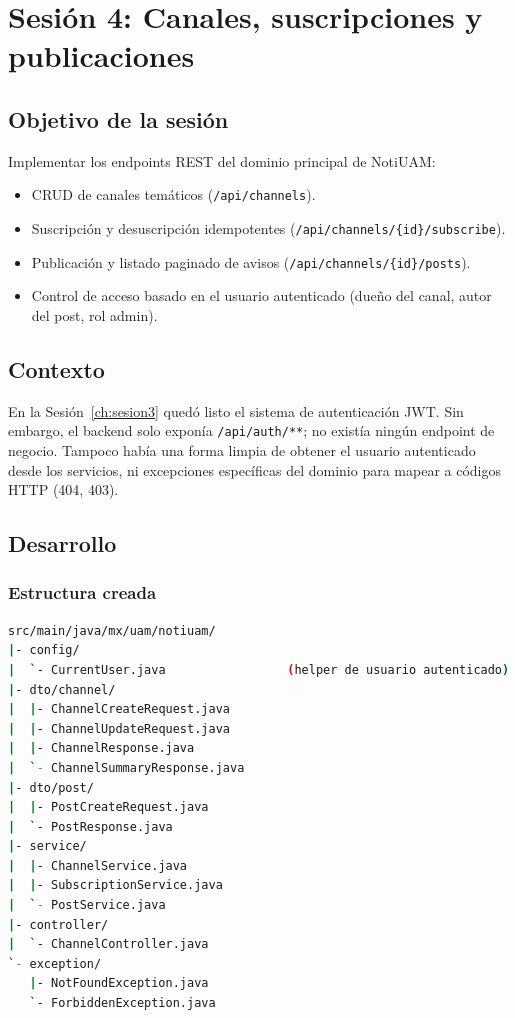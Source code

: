 \chapter{Sesión 4: Canales, suscripciones y publicaciones}
\label{ch:sesion4}

\section{Objetivo de la sesión}

Implementar los endpoints REST del dominio principal de NotiUAM:

\begin{itemize}[leftmargin=*]
  \item CRUD de canales temáticos (\texttt{/api/channels}).
  \item Suscripción y desuscripción idempotentes (\texttt{/api/channels/\{id\}/subscribe}).
  \item Publicación y listado paginado de avisos (\texttt{/api/channels/\{id\}/posts}).
  \item Control de acceso basado en el usuario autenticado (dueño del canal, autor del post, rol admin).
\end{itemize}

\section{Contexto}

En la Sesión~\ref{ch:sesion3} quedó listo el sistema de autenticación JWT. Sin embargo, el backend solo exponía \texttt{/api/auth/**}; no existía ningún endpoint de negocio. Tampoco había una forma limpia de obtener el usuario autenticado desde los servicios, ni excepciones específicas del dominio para mapear a códigos HTTP (404, 403).

\section{Desarrollo}

\subsection{Estructura creada}

\begin{lstlisting}[language=bash]
src/main/java/mx/uam/notiuam/
|- config/
|  `- CurrentUser.java                 (helper de usuario autenticado)
|- dto/channel/
|  |- ChannelCreateRequest.java
|  |- ChannelUpdateRequest.java
|  |- ChannelResponse.java
|  `- ChannelSummaryResponse.java
|- dto/post/
|  |- PostCreateRequest.java
|  `- PostResponse.java
|- service/
|  |- ChannelService.java
|  |- SubscriptionService.java
|  `- PostService.java
|- controller/
|  `- ChannelController.java
`- exception/
   |- NotFoundException.java
   `- ForbiddenException.java
\end{lstlisting}

